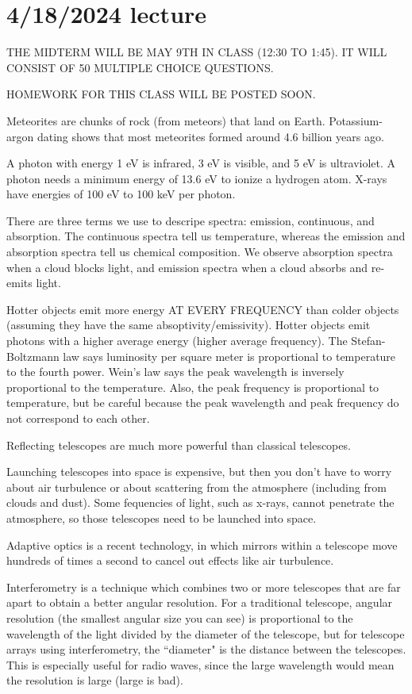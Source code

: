 \documentclass[class=article, crop=false]{standalone}
\begin{document}
\section{4/18/2024 lecture}
THE MIDTERM WILL BE MAY 9TH IN CLASS (12:30 TO 1:45). IT WILL CONSIST OF 50 MULTIPLE CHOICE QUESTIONS.
\par
HOMEWORK FOR THIS CLASS WILL BE POSTED SOON.
\par
Meteorites are chunks of rock (from meteors) that land on Earth. Potassium-argon dating shows that most meteorites formed around 4.6 billion years ago.
\par
A photon with energy 1 eV is infrared, 3 eV is visible, and 5 eV is ultraviolet. A photon needs a minimum energy of 13.6 eV to ionize a hydrogen atom. X-rays have energies of 100 eV to 100 keV per photon.
\par
There are three terms we use to descripe spectra: emission, continuous, and absorption. The continuous spectra tell us temperature, whereas the emission and absorption spectra tell us chemical composition. We observe absorption spectra when a cloud blocks light, and emission spectra when a cloud absorbs and re-emits light.
\par
Hotter objects emit more energy AT EVERY FREQUENCY than colder objects (assuming they have the same absoptivity/emissivity). Hotter objects emit photons with a higher average energy (higher average frequency). The Stefan-Boltzmann law says luminosity per square meter is proportional to temperature to the fourth power. Wein's law says the peak wavelength is inversely proportional to the temperature. Also, the peak frequency is proportional to temperature, but be careful because the peak wavelength and peak frequency do not correspond to each other.
\par
Reflecting telescopes are much more powerful than classical telescopes.
\par
Launching telescopes into space is expensive, but then you don't have to worry about air turbulence or about scattering from the atmosphere (including from clouds and dust). Some fequencies of light, such as x-rays, cannot penetrate the atmosphere, so those telescopes need to be launched into space.
\par
Adaptive optics is a recent technology, in which mirrors within a telescope move hundreds of times a second to cancel out effects like air turbulence.
\par
Interferometry is a technique which combines two or more telescopes that are far apart to obtain a better angular resolution. For a traditional telescope, angular resolution (the smallest angular size you can see) is proportional to the wavelength of the light divided by the diameter of the telescope, but for telescope arrays using interferometry, the ``diameter" is the distance between the telescopes. This is especially useful for radio waves, since the large wavelength would mean the resolution is large (large is bad).
\end{document}
